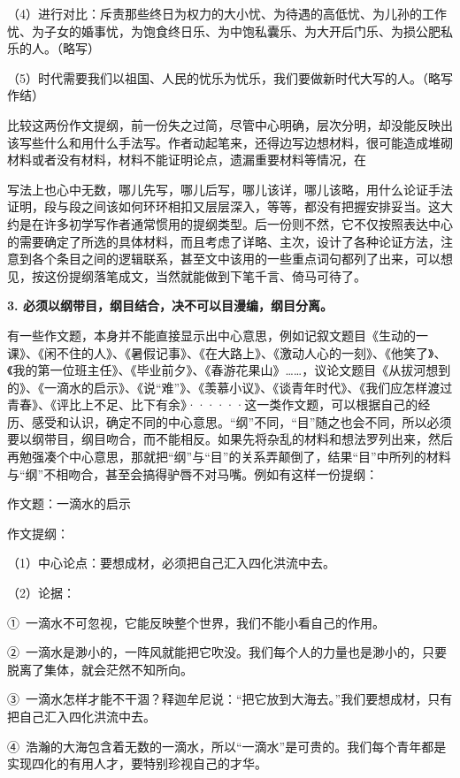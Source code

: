 （4）进行对比：斥责那些终日为权力的大小忧、为待遇的高低忧、为儿孙的工作忧、为子女的婚事忧，为饱食终日乐、为中饱私囊乐、为大开后门乐、为损公肥私乐的人。（略写）

（5）时代需要我们以祖国、人民的忧乐为忧乐，我们要做新时代大写的人。（略写作结）

比较这两份作文提纲，前一份失之过简，尽管中心明确，层次分明，却没能反映出该写些什么和用什么手法写。作者动起笔来，还得边写边想材料，很可能造成堆砌材料或者没有材料，材料不能证明论点，遗漏重要材料等情况，在

写法上也心中无数，哪儿先写，哪儿后写，哪儿该详，哪儿该略，用什么论证手法证明，段与段之间该如何环环相扣又层层深入，等等，都没有把握安排妥当。这大约是在许多初学写作者通常惯用的提纲类型。后一份则不然，它不仅按照表达中心的需要确定了所选的具体材料，而且考虑了详略、主次，设计了各种论证方法，注意到各个条目之间的逻辑联系，甚至文中该用的一些重点词句都列了出来，可以想见，按这份提纲落笔成文，当然就能做到下笔千言、倚马可待了。

\textbf{3. 必须以纲带目，纲目结合，决不可以目漫编，纲目分离。}

有一些作文题，本身并不能直接显示出中心意思，例如记叙文题目《生动的一课》、《闲不住的人》、《暑假记事》、《在大路上》、《激动人心的一刻》、《他笑了》、《我的第一位班主任》、《毕业前夕》、《春游花果山》……，议论文题目《从拔河想到的》、《一滴水的启示》、《说“难”》、《羡慕小议》、《谈青年时代》、《我们应怎样渡过青春》、《评比上不足、比下有余》······这一类作文题，可以根据自己的经历、感受和认识，确定不同的中心意思。“纲”不同，“目”随之也会不同，所以必须要以纲带目，纲目吻合，而不能相反。如果先将杂乱的材料和想法罗列出来，然后再勉强凑个中心意思，那就把“纲”与“目”的关系弄颠倒了，结果“目”中所列的材料与“纲”不相吻合，甚至会搞得驴唇不对马嘴。例如有这样一份提纲：

作文题：一滴水的启示

作文提纲：

（1）中心论点：要想成材，必须把自己汇入四化洪流中去。

（2）论据：

①\ 一滴水不可忽视，它能反映整个世界，我们不能小看自己的作用。

②\ 一滴水是渺小的，一阵风就能把它吹没。我们每个人的力量也是渺小的，只要脱离了集体，就会茫然不知所向。

③\ 一滴水怎样才能不干涸？释迦牟尼说：“把它放到大海去。”我们要想成材，只有把自己汇入四化洪流中去。

④\ 浩瀚的大海包含着无数的一滴水，所以“一滴水”是可贵的。我们每个青年都是实现四化的有用人才，要特别珍视自己的才华。

